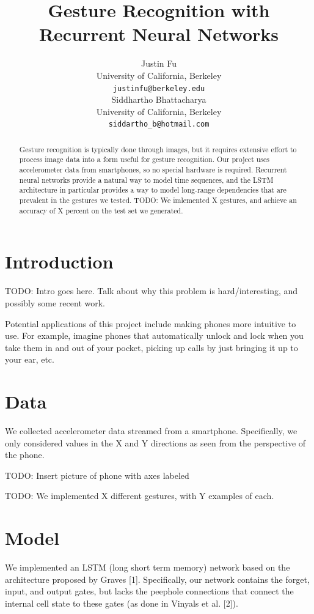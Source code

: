 \documentclass[11pt]{article}
\title{Gesture Recognition with Recurrent Neural Networks}
\author{Justin Fu \\
  University of California, Berkeley\\
  {\tt justinfu@berkeley.edu} \\\And
  Siddhartho Bhattacharya \\
  University of California, Berkeley\\
  {\tt siddartho\_b@hotmail.com} \\}
\date{}
\begin{document}
\maketitle 
\begin{abstract}
  Gesture recognition is typically done through images, but it requires
  extensive effort to process image data into a form useful for gesture
  recognition. Our project uses accelerometer data from smartphones,
  so no special hardware is required.
  Recurrent neural networks provide a natural way to model time
  sequences, and the LSTM architecture in particular provides a way
  to model long-range dependencies that are prevalent in
  the gestures we tested. TODO: We imlemented X gestures, and achieve an
  accuracy of X percent on the test set we generated.
\end{abstract}

\section{Introduction}

TODO: Intro goes here. Talk about why this problem is
hard/interesting, and possibly some recent work.

Potential applications of this project include making
phones more intuitive to use. For example, imagine 
phones that automatically unlock and lock when you take 
them in and out of your pocket, picking up calls by just
bringing it up to your ear, etc.

\section{Data}

We collected accelerometer data streamed from a smartphone.
Specifically, we only considered values in the X and Y directions
as seen from the perspective of the phone. 

TODO: Insert picture of phone with axes labeled

TODO: We implemented X different gestures, with Y examples of each.

\section{Model}
\label{sect:pdf}

We implemented an LSTM (long short term memory) network based on
the architecture proposed by Graves [1]. Specifically,
our network contains the forget, input, and output gates, but lacks the
peephole connections that connect the internal cell state to these gates
(as done in Vinyals et al. [2]).
\end{document}
